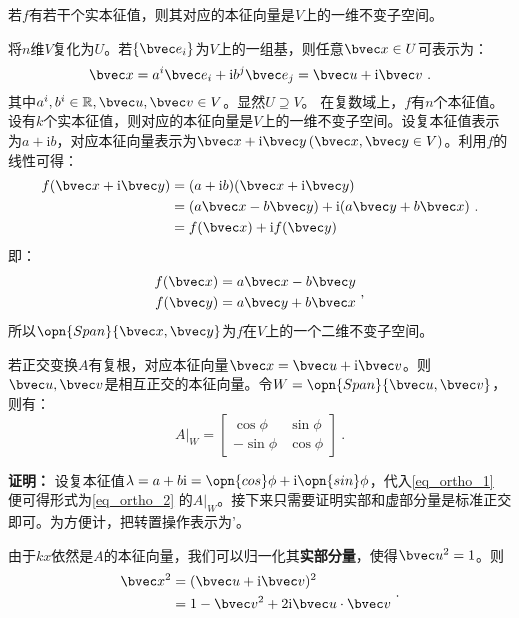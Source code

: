 若$f$有若干个实本征值，则其对应的本征向量是$V$上的一维不变子空间。

将$n$维$V$复化为$U$。若$\{\bvec e_i\}$为$V$上的一组基，则任意$\bvec x\in U$可表示为：
\begin{equation}
\bvec x=a^i\bvec e_i+\mathrm i b^j\bvec e_j=\bvec u+\mathrm i\bvec v~.
\end{equation}
其中$a^i,b^i\in \mathbb R,\bvec u,\bvec v\in V$。显然$U\supseteq V$。
在复数域上，$f$有$n$个本征值。设有$k$个实本征值，则对应的本征向量是$V$上的一维不变子空间。设复本征值表示为$a+\mathrm ib$，对应本征向量表示为$\bvec x+\mathrm i \bvec y\,(\bvec x,\bvec y\in V)$。利用$f$的线性可得：
\begin{equation}
\begin{aligned}
f(\bvec x+\mathrm i \bvec y)&=(a+\mathrm i b)(\bvec x+\mathrm i \bvec y)\\
&=(a\bvec x-b\bvec y)+\mathrm i(a\bvec y+b\bvec x)\\
&=f(\bvec x)+\mathrm if(\bvec y)
\end{aligned}~.
\end{equation}
即：
\begin{equation}\label{eq_ortho_1}
\begin{aligned}
f(\bvec x)&=a\bvec x-b\bvec y\\
f(\bvec y)&=a\bvec y+b\bvec x
\end{aligned}~,
\end{equation}
所以$\opn{Span}\{\bvec x,\bvec y\}$为$f$在$V$上的一个二维不变子空间。
\begin{lemma}{}\label{lem_ortho_3}
若正交变换$A$有复根，对应本征向量$\bvec x=\bvec u+\mathrm i\bvec v$。则$\bvec u,\bvec v$是相互正交的本征向量。令$W=\opn{Span}\{\bvec u,\bvec v\}$，则有：
\begin{equation}\label{eq_ortho_2}
A|_W=\left[\begin{array}{rr}
\cos \phi & \sin \phi \\
-\sin \phi & \cos \phi
\end{array}\right]~.
\end{equation}
\end{lemma}
\textbf{证明：}
设复本征值$\lambda=a+b\mathrm i=\opn{cos}\phi+\mathrm i \opn{sin}\phi$，代入\autoref{eq_ortho_1} 便可得形式为\autoref{eq_ortho_2} 的$A|_W$。接下来只需要证明实部和虚部分量是标准正交即可。为方便计，把转置操作表示为'。

由于$kx$依然是$A$的本征向量，我们可以归一化其\textbf{实部分量}，使得$\bvec u^2=1$。则
\begin{equation}\label{eq_ortho_3}
\begin{aligned}
\bvec x^2&=(\bvec u+\mathrm i\bvec v)^2\\
&=1-\bvec v^2+2\mathrm i \bvec u\cdot\bvec v
\end{aligned}~.
\end{equation}

